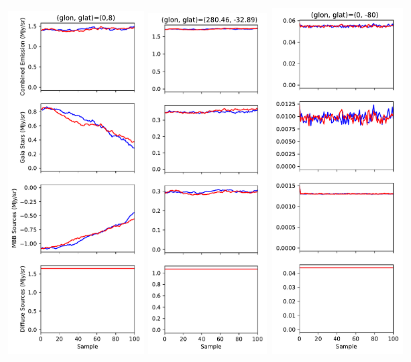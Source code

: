 \documentclass{aa}
\begin{document}
\begin{figure}
  \centering
  \includegraphics[width=0.32\textwidth]{figs/mixing/trace_1352704.pdf}
  \includegraphics[width=0.28\textwidth]{figs/mixing/trace_2429499.pdf}
  \includegraphics[width=0.31\textwidth]{figs/mixing/trace_3121308.pdf}\\

\end{figure}
\end{document}
